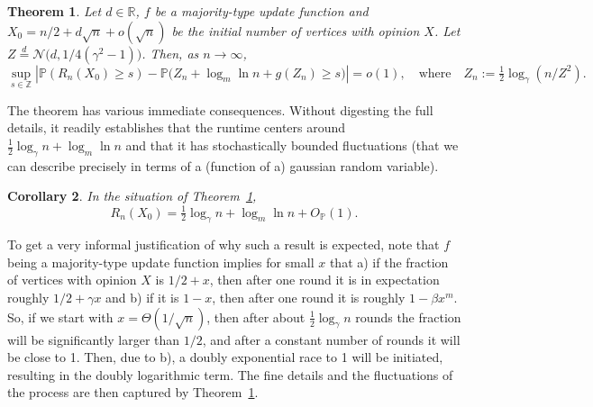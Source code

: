 \documentclass[11pt]{article}
\newcommand{\Prob}{\mathbb{P}}
\newtheorem{theorem}{Theorem}
\numberwithin{theorem}{section}
\newtheorem{corollary}[theorem]{Corollary}
\begin{document}
\begin{theorem}
\label{thm: main result}
Let $d\in\mathbb{R}$, $f$ be a majority-type update function and  $X_0=n/2 + d\sqrt{n}+o(\sqrt{n})$ be the initial number of vertices with opinion $X$. Let $Z \stackrel{d}{=} \mathcal{N}\big(d,1/4(\gamma^2-1)\big)$. Then, as $n\to \infty$,
\[
    \sup_{s\in\mathbb{Z}}
    \left| \Prob\left(R_n(X_0) \geq s\right) -
    \Prob\Big(
        Z_n + \log_m\ln n + g(Z_n) \geq s
    \Big)
    \right|
    = o(1), 
    \quad
    \text{where}
    \quad
    Z_n :=\tfrac{1}{2}\log_\gamma(n/Z^2).
\]
\end{theorem}
The theorem has various immediate consequences. Without digesting the full details, it readily 
establishes that the runtime centers around $\frac12\log_\gamma n + \log_m\ln n$ and that it has stochastically bounded fluctuations (that we can describe precisely in terms of a (function of a) gaussian random variable).
\begin{corollary}\label{cor: main 2}
In the situation of Theorem~\ref{thm: main result},
\[
    R_n(X_0)=  \tfrac{1}{2}\log_\gamma n + \log_m\ln n + O_\Prob(1).
\]
\end{corollary}
To get a very informal justification of why such a result is expected, note that $f$ being a majority-type update function implies for small $x$ that a) if the fraction of vertices with opinion $X$ is $1/2 + x$, then after one round it is in expectation roughly $1/2 + \gamma x$ and b) if it is $1-x$, then after one round it is roughly $1-\beta x^m$. So, if we start with $x = \Theta(1/\sqrt{n})$, then after about $\frac{1}{2}\log_\gamma n$ rounds the fraction will be significantly larger than $1/2$, and after a constant number of rounds it will be close to 1. Then, due to b), a doubly exponential race to 1 will be initiated, resulting in the doubly logarithmic term. The fine details and the fluctuations of the process are then captured by Theorem~\ref{thm: main result}.
\end{document}

